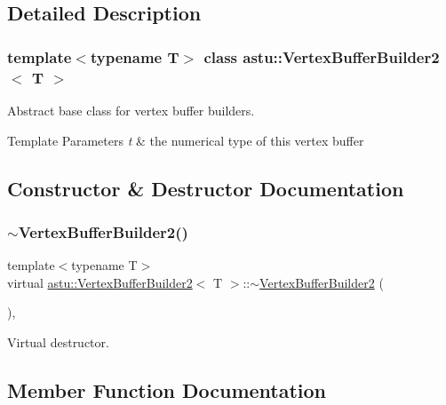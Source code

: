 \subsection{Detailed Description}
\subsubsection*{template$<$typename T$>$\newline
class astu\+::\+Vertex\+Buffer\+Builder2$<$ T $>$}

Abstract base class for vertex buffer builders.


\begin{DoxyTemplParams}{Template Parameters}
{\em t} & the numerical type of this vertex buffer \\
\hline
\end{DoxyTemplParams}


\subsection{Constructor \& Destructor Documentation}
\mbox{\label{classastu_1_1VertexBufferBuilder2_a811979f1ea54191c4974b122b0e54999}} 
\subsubsection{\texorpdfstring{$\sim$\+Vertex\+Buffer\+Builder2()}{~VertexBufferBuilder2()}}
{\footnotesize\ttfamily template$<$typename T$>$ \\
virtual \hyperlink{classastu_1_1VertexBufferBuilder2}{astu\+::\+Vertex\+Buffer\+Builder2}$<$ T $>$\+::$\sim$\hyperlink{classastu_1_1VertexBufferBuilder2}{Vertex\+Buffer\+Builder2} (\begin{DoxyParamCaption}{ }\end{DoxyParamCaption})\hspace{0.3cm}{\ttfamily [inline]}, {\ttfamily [virtual]}}

Virtual destructor. 

\subsection{Member Function Documentation}
\mbox{\label{classastu_1_1VertexBufferBuilder2_ab96f2f382b9f855ead02ed2cd1391147}} 
